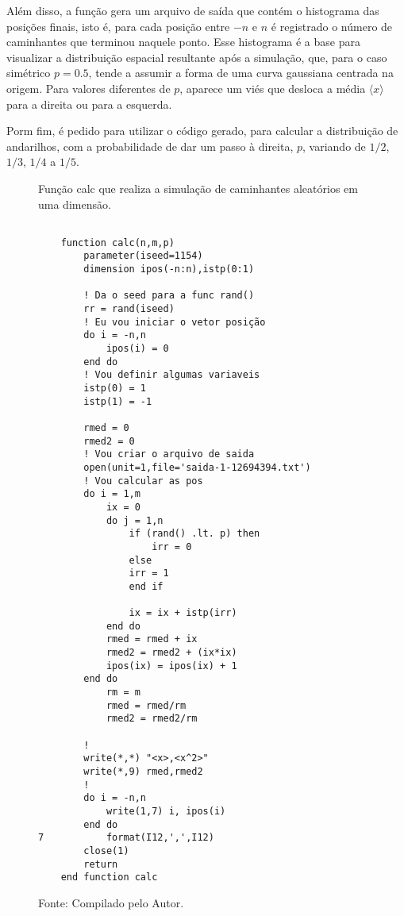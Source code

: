 Além disso, a função gera um arquivo de saída que contém o histograma das posições 
finais, isto é, para cada posição entre $-n$ e $n$ é registrado o número de caminhantes 
que terminou naquele ponto. Esse histograma é a base para visualizar a distribuição 
espacial resultante após a simulação, que, para o caso simétrico $p = 0.5$, tende a 
assumir a forma de uma curva gaussiana centrada na origem. Para valores diferentes 
de $p$, aparece um viés que desloca a média $\langle x \rangle$ para a direita ou 
para a esquerda.

Porm fim, é pedido para utilizar o código gerado, para calcular 
a distribuição de andarilhos, com a probabilidade de dar um passo à direita, $p$, 
variando de $1/2$, $1/3$, $1/4$ a $1/5$.

\vspace*{2\baselineskip}

\begin{figure}[h!]
\centering
\caption{Função calc que realiza a simulação de caminhantes aleatórios em uma dimensão.}
\centering
  
\begin{lstlisting}

    function calc(n,m,p)
        parameter(iseed=1154)
        dimension ipos(-n:n),istp(0:1)
        
        ! Da o seed para a func rand()
        rr = rand(iseed)
        ! Eu vou iniciar o vetor posição
        do i = -n,n
            ipos(i) = 0
        end do
        ! Vou definir algumas variaveis
        istp(0) = 1
        istp(1) = -1

        rmed = 0
        rmed2 = 0
        ! Vou criar o arquivo de saida
        open(unit=1,file='saida-1-12694394.txt')
        ! Vou calcular as pos
        do i = 1,m
            ix = 0
            do j = 1,n
                if (rand() .lt. p) then
                    irr = 0
                else
                irr = 1
                end if

                ix = ix + istp(irr) 
            end do
            rmed = rmed + ix
            rmed2 = rmed2 + (ix*ix)
            ipos(ix) = ipos(ix) + 1
        end do
            rm = m
            rmed = rmed/rm
            rmed2 = rmed2/rm
        
        !
        write(*,*) "<x>,<x^2>"
        write(*,9) rmed,rmed2
        !
        do i = -n,n
            write(1,7) i, ipos(i)
        end do
7           format(I12,',',I12)
        close(1)
        return
    end function calc
\end{lstlisting}

\caption*{Fonte: Compilado pelo Autor.}
\label{fig:função_calc}
\end{figure}

